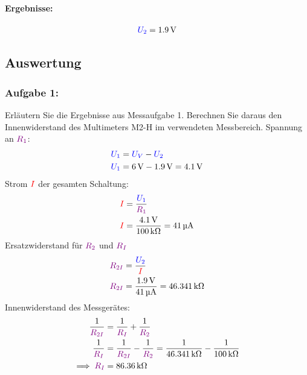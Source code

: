 \documentclass[11pt,a4paper,titlepage]{scrreprt}
\begin{document}
            \paragraph{Ergebnisse:}
                \begin{align*}
                    \textcolor{blue}{U_2} = \SI{1,9}{\volt}
                \end{align*}
           
            
            \subsection{Auswertung}
            \subsubsection{Aufgabe 1:}  Erläutern Sie die Ergebnisse aus Messaufgabe 1. Berechnen Sie daraus den Innenwiderstand des Multimeters M2-H im verwendeten Messbereich.
                Spannung an $\textcolor{violet}{R_1}$:
                \begin{align*}
                    \textcolor{blue}{U_1} &= \textcolor{blue}{U_V} - \textcolor{blue}{U_2}\\
                    \textcolor{blue}{U_1} &= \SI{6}{\volt} - \SI{1,9}{\volt} = \SI{4,1}{\volt}
                \end{align*}
                Strom $\textcolor{red}{I}$ der gesamten Schaltung:
                \begin{align*}
                    \textcolor{red}{I} &= \frac{\textcolor{blue}{U_1}}{\textcolor{violet}{R_1}}\\
                    \textcolor{red}{I} &= \frac{\SI{4,1}{\volt}}{\SI{100}{\kilo\ohm}} = \SI{41}{\micro\ampere}                    
                \end{align*}
                Ersatzwiderstand für $\textcolor{violet}{R_2}$ und $\textcolor{violet}{R_I}$
                \begin{align*}
                    \textcolor{violet}{R_{2I}} &= \frac{\textcolor{blue}{U_2}}{\textcolor{red}{I}}\\
                    \textcolor{violet}{R_{2I}} &= \frac{\SI{1,9}{\volt}}{\SI{41}{\micro\ampere}} = \SI{46,341}{\kilo\ohm}
                \end{align*}
                Innenwiderstand des Messgerätes:
                \begin{align*}
                    \frac{1}{\textcolor{violet}{R_{2I}}} &= \frac{1}{\textcolor{violet}{R_I}} + \frac{1}{\textcolor{violet}{R_2}}\\
                    \frac{1}{\textcolor{violet}{R_I}} &= \frac{1}{\textcolor{violet}{R_{2I}}} - \frac{1}{\textcolor{violet}{R_2}} = \frac{1}{\SI{46,341}{\kilo\ohm}} - \frac{1}{\SI{100}{\kilo\ohm}}\\
                    \implies \textcolor{violet}{R_I} &= \SI{86,36}{\kilo\ohm} 
                \end{align*}
\end{document}
